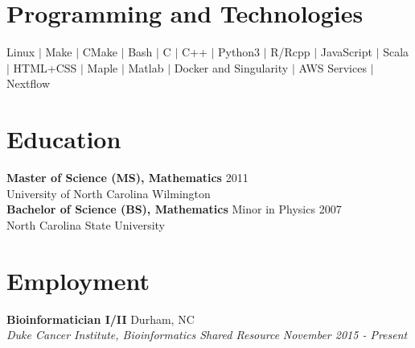 \documentclass[10pt]{article}
\begin{document}

\section*{Programming and Technologies}

Linux $|$ Make $|$ CMake $|$ Bash $|$ C $|$ C++ $|$ Python3 $|$ R/Rcpp $|$ JavaScript $|$ Scala $|$ 
 HTML+CSS $|$ Maple $|$ Matlab $|$ Docker and Singularity $|$ AWS Services $|$ Nextflow


\section*{Education}

{\bf Master of Science (MS), Mathematics} \hfill 2011\\
University of North Carolina Wilmington
\vspace{5pt}\\
\noindent
{\bf Bachelor of Science (BS), Mathematics} Minor in Physics \hfill 2007\\
North Carolina State University


\section*{Employment}

\noindent
{\bf Bioinformatician I/II} \hfill Durham, NC\\
{\it Duke Cancer Institute, Bioinformatics Shared Resource} \hfill {\it November 2015 - Present}
\end{document}
